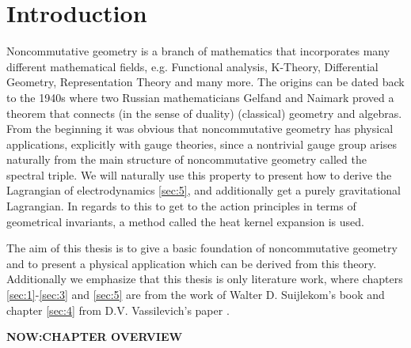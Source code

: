 \section{Introduction}
Noncommutative geometry is a branch of mathematics that incorporates many
different mathematical fields, e.g. Functional analysis, K-Theory,
Differential Geometry, Representation Theory and many more. The origins can
be dated back to the 1940s where two Russian mathematicians Gelfand and
Naimark proved a theorem that connects (in the sense of duality) (classical)
geometry and algebras. From the beginning it was obvious that noncommutative
geometry has physical applications, explicitly with gauge theories, since a
nontrivial gauge group arises naturally from the main structure of
noncommutative geometry called the spectral triple. We will naturally use
this property to present how to derive the Lagrangian of electrodynamics
\ref{sec:5}, and additionally get a purely gravitational Lagrangian.
In regards to this to get to the action principles in terms of geometrical
invariants, a method called the heat kernel expansion is used.

The aim of this thesis is to give a basic foundation of noncommutative
geometry and to present a physical application which can be derived from this
theory. Additionally we emphasize that this thesis is only literature work,
where chapters \ref{sec:1}-\ref{sec:3} and \ref{sec:5} are from
the work of Walter D. Suijlekom's book \cite{ncgwalter} and chapter
\ref{sec:4} from D.V. Vassilevich's paper \cite{heatkernel}.

\textbf{NOW:CHAPTER OVERVIEW}
